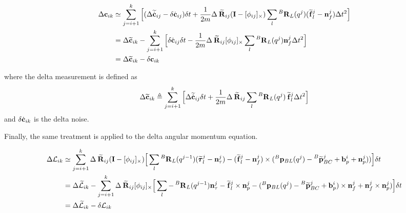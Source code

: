 \documentclass[11pt]{article}
\newcommand{\Rot}[2]{\prescript{#1}{}{\bfR}_{#2}}
\newcommand{\Rotm}[2]{\prescript{#1}{}{\widetilde{\bfR}}_{#2}}
\newcommand{\noise}{\bfn}
\newcommand{\bias}{\bfb}
\newcommand{\posi}[2]{\prescript{#1}{}{\bfp}_{#2}}
\newcommand{\posim}[2]{\prescript{#1}{}{\widetilde{\bfp}}_{#2}}
\newcommand{\forcem}[2]{\prescript{#1}{}{\widetilde{\bff}}_{#2}}
\newcommand{\torquem}[2]{\prescript{#1}{}{\widetilde{\pmb{\tau}}}_{#2}}
\newcommand{\AM}{\mathcal{L}}
\newcommand{\AMm}{\widetilde{\mathcal{L}}}
\newcommand{\COM}{\bfc}
\newcommand{\COMm}{\widetilde{\bfc}}
\newcommand{\COMd}{\dot{\bfc}}
\newcommand{\COMdm}{\widetilde{\dot{\bfc}}}
\newcommand{\Ident}{\bfI}
\begin{document}
\begin{equation}
\begin{split}
\Delta \COM_{ik} &\simeq
\sum_{j=i+1}^{k} \Big[ (\Delta \COMdm_{ij} - \delta \COMd_{ij}) \delta t + \frac{1}{2m} \Delta \Rotm{}{ij}(\Ident - [\phi_{ij}]_{\times}) \sum_l \Rot{B}{L}(q^{j}) (\forcem{}{l}^{j} - \noise_f^{j}) \Delta t^2 \Big]
\\
&= \Delta \COMm_{ik} - \sum_{j=i+1}^{k} \Big[ \delta \COMd_{ij} \delta t - \frac{1}{2m} \Delta \Rotm{}{ij}[\phi_{ij}]_{\times} \sum_l \Rot{B}{L}(q^{j}) \noise_f^{j} \Delta t^2 \Big]
\\
&= \Delta \COMm_{ik} - \delta \COM_{ik}
\end{split}
\end{equation}

where the delta measurement is defined as
\begin{equation}
    \Delta \COMm_{ik} \triangleq 
    \sum_{j=i+1}^{k} \Big[\Delta \COMdm_{ij} \delta t + \frac{1}{2m} \Delta \Rotm{}{ij} \sum_l \Rot{B}{L}(q^{j}) \forcem{}{l}^{j} \Delta t^2 \Big]
\end{equation}
 and $\delta \COMd_{ik}$ is the delta noise.

Finally, the same treatment is applied to the delta angular momentum equation.

\begin{equation}
\begin{split}
\Delta \AM_{ik} &\simeq
\sum_{j=i+1}^{k} \Delta \Rotm{}{ij}(\Ident - [\phi_{ij}]_{\times}) \Big[ 
\sum_l \Rot{B}{L}(q^{j-1}) (\torquem{}{l}^{j} - \noise_{\tau}^{j}) - (\forcem{}{l}^{j} - \noise_f^{j}) \times (\posi{B}{BL}(q^j) - \posim{B}{BC}^j + \bias_{p}^i + \noise_p^j)) \Big]  \delta t
\\
&= \Delta \AMm_{ik} -\sum_{j=i+1}^{k} \Delta \Rotm{}{ij}[\phi_{ij}]_{\times} \Big[ 
\sum_l - \Rot{B}{L}(q^{j-1}) \noise_{\tau}^{j} - %
\forcem{}{l}^{j} \times \noise_p^j - (\posi{B}{BL}(q^j) - \posim{B}{BC}^j + \bias_{p}^i) \times \noise_f^{j} + \noise_f^{j} \times \noise_p^j) \Big]  \delta t
\\
&= \Delta \AMm_{ik} - \delta \AM_{ik}
\end{split}
\end{equation}
\end{document}
